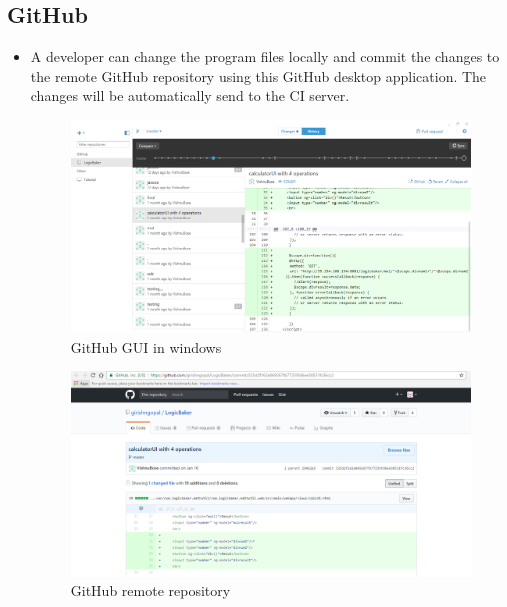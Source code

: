 \documentclass[12pt,a4paper,oneside]{report}
\begin{document}
{\subsection{GitHub}
\begin{itemize}
\item \par A developer can change the program files locally and commit the changes to the remote GitHub repository using this GitHub desktop application. The changes will be automatically send to the CI server.
\begin{figure}[h]
\begin{center}
\includegraphics[scale=.47]{git.png}
\caption{GitHub GUI in windows}
\label{GitHub GUI in windows}
\end{center}
\end{figure}
\pagebreak
\begin{figure}[h]
\begin{center}
\includegraphics[scale=.47]{remote.png}
\caption{GitHub remote repository }
\label{GitHub remote repository}
\end{center}
\end{figure}
\end{itemize}
\pagebreak
\newpage
}
\end{document}
